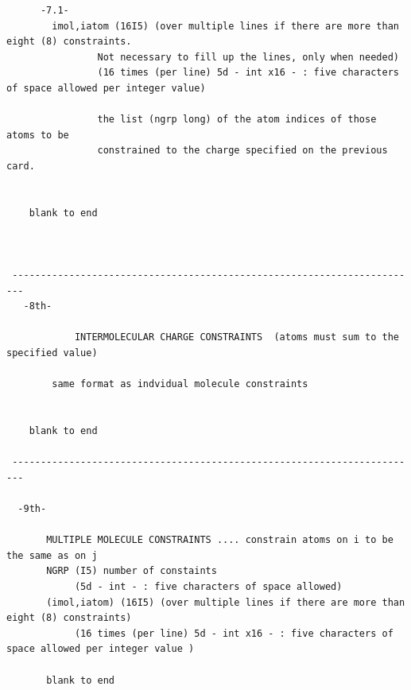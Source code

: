 \documentclass[a4paper]{article}
\begin{document}
\begin{tcolorbox}
\begin{verbatim}
      -7.1-  
        imol,iatom (16I5) (over multiple lines if there are more than eight (8) constraints.
                Not necessary to fill up the lines, only when needed)
                (16 times (per line) 5d - int x16 - : five characters of space allowed per integer value)
 
                the list (ngrp long) of the atom indices of those atoms to be
                constrained to the charge specified on the previous card.
 
    
    blank to end
 
 
 
 ------------------------------------------------------------------------
   -8th-

            INTERMOLECULAR CHARGE CONSTRAINTS  (atoms must sum to the specified value)
 
        same format as indvidual molecule constraints


    blank to end
 
 ------------------------------------------------------------------------
 
  -9th- 

       MULTIPLE MOLECULE CONSTRAINTS .... constrain atoms on i to be the same as on j
       NGRP (I5) number of constaints 
            (5d - int - : five characters of space allowed)
       (imol,iatom) (16I5) (over multiple lines if there are more than eight (8) constraints)
            (16 times (per line) 5d - int x16 - : five characters of space allowed per integer value )
 
       blank to end
\end{verbatim}
\end{tcolorbox}
\end{document}
